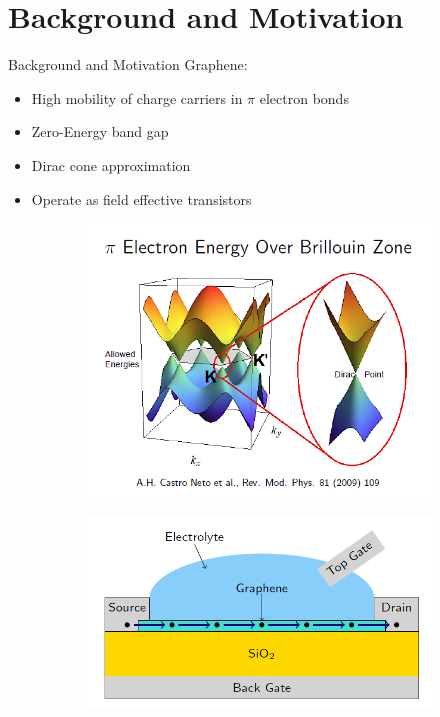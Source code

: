 \documentclass{beamer}
\begin{document}
\section{Background and Motivation}
\begin{frame}{Background and Motivation}
Graphene:
\begin{itemize}
    \item High mobility of charge carriers in $\pi$ electron bonds
    \item Zero-Energy band gap
    \item Dirac cone approximation
    \item Operate as field effective transistors
\end{itemize}
   \begin{figure}[!ht]
     \begin{subfigure}[b]{0.45\linewidth}
       \includegraphics[width=\linewidth]{band_struct.PNG}
     \end{subfigure}
     \hfill
     \begin{subfigure}[b]{0.45\linewidth}
       \includegraphics[width=\linewidth]{FET.PNG}
     \end{subfigure}
   \end{figure}
\end{frame}
\end{document}
